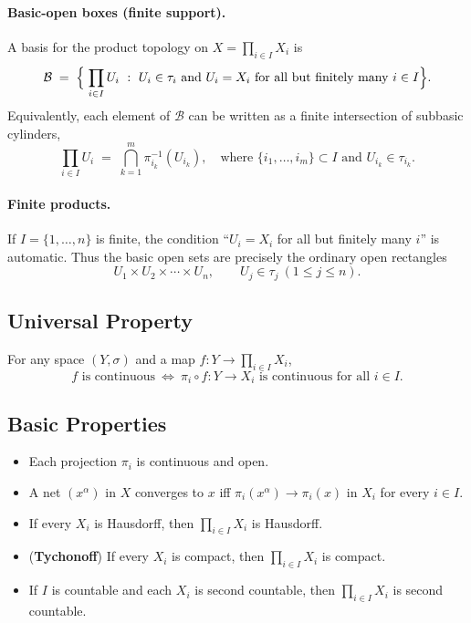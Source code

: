 \documentclass[12pt,a4paper]{article}
\theoremstyle{plain}
\theoremstyle{definition}
\theoremstyle{remark}
\theoremstyle{remark}
\begin{document}
\paragraph{Basic-open boxes (finite support).}
A basis for the product topology on $X=\prod_{i\in I} X_i$ is
\[
\mathcal{B}\;=\;\Bigl\{\; \prod_{i\in I} U_i \ :\ U_i\in\tau_i\ \text{and}\ U_i=X_i\ \text{for all but finitely many } i\in I \Bigr\}.
\]
Equivalently, each element of $\mathcal{B}$ can be written as a finite intersection of subbasic cylinders,
\[
\prod_{i\in I} U_i \;=\; \bigcap_{k=1}^m \pi_{i_k}^{-1}(U_{i_k}),
\quad\text{where } \{i_1,\dots,i_m\}\subset I \text{ and } U_{i_k}\in\tau_{i_k}.
\]

\paragraph{Finite products.}
If $I=\{1,\dots,n\}$ is finite, the condition “$U_i=X_i$ for all but finitely many $i$” is automatic.
Thus the basic open sets are precisely the ordinary open rectangles
\[
U_1 \times U_2 \times \cdots \times U_n, \qquad U_j \in \tau_j \ (1\le j \le n).
\]

\subsection*{Universal Property}
For any space $(Y,\sigma)$ and a map $f:Y\to \prod_{i\in I}X_i$,
\[
f \text{ is continuous}\ \Longleftrightarrow\ \pi_i\circ f:Y\to X_i \text{ is continuous for all } i\in I.
\]

\subsection*{Basic Properties}
\begin{itemize}
	\item Each projection $\pi_i$ is continuous and open.
	\item A net $(x^\alpha)$ in $X$ converges to $x$ iff $\pi_i(x^\alpha)\to \pi_i(x)$ in $X_i$ for every $i\in I$.
	\item If every $X_i$ is Hausdorff, then $\prod_{i\in I}X_i$ is Hausdorff.
	\item (\textbf{Tychonoff}) If every $X_i$ is compact, then $\prod_{i\in I}X_i$ is compact.
	\item If $I$ is countable and each $X_i$ is second countable, then $\prod_{i\in I}X_i$ is second countable.
\end{itemize}
\end{document}
